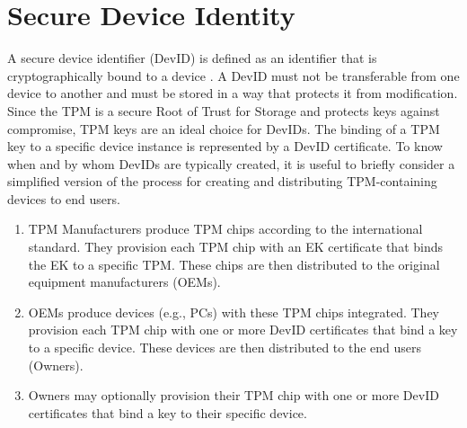 \documentclass[runningheads]{llncs}
\begin{document}
\section{Secure Device Identity}
A secure device identifier (DevID) is defined as an identifier that is cryptographically bound to a device \cite{DevIDSpec-IEEE}. A DevID must not be transferable from one device to another and must be stored in a way that protects it from modification. Since the TPM is a secure Root of Trust for Storage and protects keys against compromise, TPM keys are an ideal choice for DevIDs. 
The binding of a TPM key to a specific device instance is represented by a DevID certificate.
To know when and by whom DevIDs are typically created, it is useful to briefly consider a simplified version of the process for creating and distributing TPM-containing devices to end users.
\begin{enumerate}
  \item\label{ite:idTPM} TPM Manufacturers produce TPM chips according to the international standard. They provision each TPM chip with an EK certificate that binds the EK to a specific TPM. These chips are then distributed to the original equipment manufacturers (OEMs).
  \item\label{ite:idDevIni} OEMs produce devices (e.g., PCs) with these TPM chips integrated. They provision each TPM chip with one or more DevID certificates that bind a key to a specific device. These devices are then distributed to the end users (Owners).
  \item\label{ite:idDevLoc} Owners may optionally provision their TPM chip with one or more DevID certificates that bind a key to their specific device.
\end{enumerate} 
\end{document}
